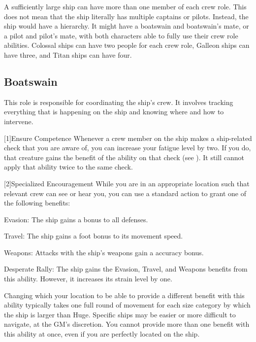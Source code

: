     A sufficiently large ship can have more than one member of each crew role.
    This does not mean that the ship literally has multiple captains or pilots.
    Instead, the ship would have a hierarchy.
    It might have a boatswain and boatswain's mate, or a pilot and pilot's mate, with both characters able to fully use their crew role abilities.
    Colossal ships can have two people for each crew role, Galleon ships can have three, and Titan ships can have four.


    \subsection{Boatswain}
        This role is responsible for coordinating the ship's crew.
        It involves tracking everything that is happening on the ship and knowing where and how to intervene.

        [1]{Ensure Competence} Whenever a crew member on the ship makes a ship-related check that you are aware of, you can increase your fatigue level by two.
        If you do, that creature gains the benefit of the  ability on that check (see ).
        It still cannot apply that ability twice to the same check.

        [2]{Specialized Encouragement} While you are in an appropriate location such that relevant crew can see or hear you, you can use a standard action to grant one of the following benefits:
        \begin{raggeditemize}
            \item Evasion: The ship  gains a  bonus to all defenses.
            \item Travel: The ship  gains a  foot bonus to its movement speed.
            \item Weapons: Attacks with the ship's weapons  gain a  accuracy bonus.
            \item Desperate Rally: The ship  gains the Evasion, Travel, and Weapons benefits from this ability.
                However, it increases its strain level by one.
        \end{raggeditemize}

        Changing which your location to be able to provide a different benefit with this ability typically takes one full round of movement for each size category by which the ship is larger than Huge.
        Specific ships may be easier or more difficult to navigate, at the GM's discretion.
        You cannot provide more than one benefit with this ability at once, even if you are perfectly located on the ship.

